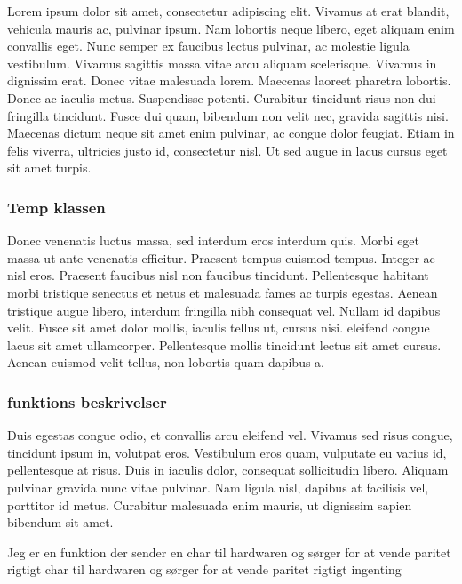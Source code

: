 Lorem ipsum dolor sit amet, consectetur adipiscing elit. Vivamus at erat blandit, vehicula mauris ac, pulvinar ipsum. Nam lobortis neque libero, eget aliquam enim convallis eget. Nunc semper ex faucibus lectus pulvinar, ac molestie ligula vestibulum. Vivamus sagittis massa vitae arcu aliquam scelerisque. Vivamus in dignissim erat. Donec vitae malesuada lorem. Maecenas laoreet pharetra lobortis. Donec ac iaculis metus. Suspendisse potenti. Curabitur tincidunt risus non dui fringilla tincidunt. Fusce dui quam, bibendum non velit nec, gravida sagittis nisi. Maecenas dictum neque sit amet enim pulvinar, ac congue dolor feugiat. Etiam in felis viverra, ultricies justo id, consectetur nisl. Ut sed augue in lacus  cursus eget sit amet turpis.


\subsubsection{Temp klassen}
Donec venenatis luctus massa, sed interdum eros interdum quis. Morbi eget massa ut ante venenatis efficitur. Praesent tempus euismod tempus. Integer ac nisl eros. Praesent faucibus nisl non faucibus tincidunt. Pellentesque habitant morbi tristique senectus et netus et malesuada fames ac turpis egestas. Aenean tristique augue libero, interdum fringilla nibh consequat vel. Nullam id dapibus velit. Fusce sit amet dolor mollis, iaculis tellus ut, cursus nisi.  eleifend congue lacus sit amet ullamcorper. Pellentesque mollis tincidunt lectus sit amet cursus. Aenean euismod velit tellus, non lobortis quam dapibus a.


\subsubsection{funktions beskrivelser}
Duis egestas congue odio, et convallis arcu eleifend vel. Vivamus sed risus congue, tincidunt ipsum in, volutpat eros. Vestibulum eros quam, vulputate eu varius id, pellentesque at risus. Duis in iaculis dolor, consequat sollicitudin libero. Aliquam pulvinar gravida nunc vitae pulvinar. Nam ligula nisl, dapibus at facilisis vel, porttitor id metus. Curabitur malesuada enim mauris, ut dignissim sapien bibendum sit amet.


{Jeg er en funktion der sender en char til hardwaren og sørger for at vende paritet rigtigt char til hardwaren og sørger for at vende paritet rigtigt}
{ingenting}
{
}

